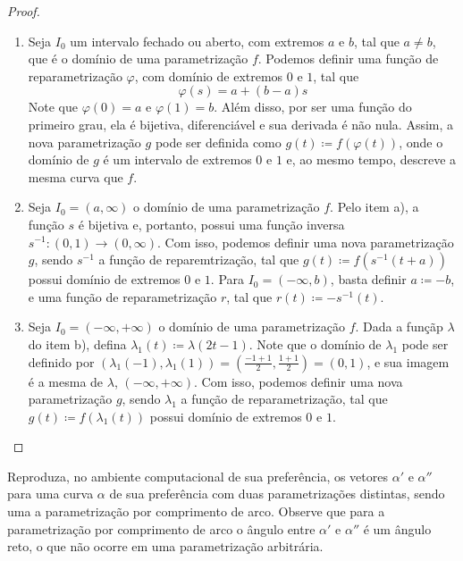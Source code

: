 \documentclass[../main.tex]{subfiles}
\begin{document}
\begin{solucao}
\begin{enumerate}[label=\alph*)]
\begin{proof}
			\begin{enumerate}[label=\textbf{Caso \arabic*:}]
				\item Seja $I_0$ um intervalo fechado ou aberto, com extremos $a$ e $b$, tal que $a\neq b$, que é o domínio de uma parametrização $f$. Podemos definir uma função de reparametrização $\varphi$, com domínio de extremos $0$ e $1$, tal que
				$$\varphi(s)=a+(b-a)s$$
				Note que $\varphi(0)=a$ e $\varphi(1)=b$. Além disso, por ser uma função do primeiro grau, ela é bijetiva, diferenciável e sua derivada é não nula.
				Assim, a nova parametrização $g$ pode ser definida como $g(t)\coloneq f(\varphi(t))$, onde o domínio de $g$ é um intervalo de extremos $0$ e $1$ e, ao mesmo tempo, descreve a mesma curva que $f$.
				\item Seja  $I_0=(a,\infty)$ o domínio de uma parametrização $f$. Pelo item a), a função $s$ é bijetiva e, portanto, possui uma função inversa $s^{-1}:(0,1)\rightarrow(0,\infty)$. Com isso, podemos definir uma nova parametrização $g$, sendo $s^{-1}$ a função de reparemtrização, tal que $g(t)\coloneq f(s^{-1}(t+a))$ possui domínio de extremos $0$ e $1$. Para $I_0=(-\infty,b)$, basta definir $a\coloneq -b$, e uma função de reparametrização $r$, tal que $r(t)\coloneq -s^{-1}(t)$.
				\item Seja  $I_0=(-\infty,+\infty)$ o domínio de uma parametrização $f$. Dada a funçãp $\lambda$ do item b), defina $\lambda_1(t)\coloneq \lambda(2t-1)$. Note que o domínio de $\lambda_1$ pode ser definido por $(\lambda_1(-1),\lambda_1(1))=(\frac{-1+1}{2},\frac{1+1}{2})=(0,1)$, e sua imagem é a mesma de $\lambda$, $(-\infty,+\infty)$. Com isso, podemos definir uma nova parametrização $g$, sendo $\lambda_1$ a função de reparametrização, tal que $g(t)\coloneq f(\lambda_1(t))$ possui domínio de extremos $0$ e $1$.
			\end{enumerate}
			
		\end{proof}
	\end{enumerate}
\end{solucao}


\begin{exercicio}{6}
	Reproduza, no ambiente computacional de sua preferência, os vetores $\alpha'$ e $\alpha''$ para uma curva $\alpha$ de sua preferência com duas parametrizações distintas, sendo uma a parametrização por comprimento de arco. Observe que para a parametrização por comprimento de arco o ângulo entre $\alpha'$ e $\alpha''$ é um ângulo reto, o que não ocorre em uma parametrização arbitrária.
\end{exercicio}
\end{document}
